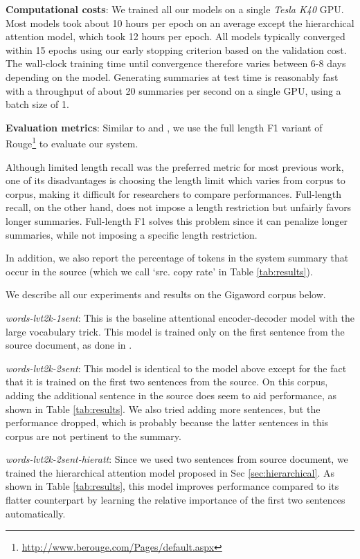 {\bf Computational costs}: We trained all our models on a single {\it Tesla K40} GPU. Most models took about 10 hours per epoch on an average except the hierarchical attention model, which took 12 hours per epoch. All models typically converged within 15 epochs using our early stopping criterion based on the validation cost. The wall-clock training time until convergence therefore varies between 6-8 days depending on the model. Generating summaries at test time is reasonably fast with a throughput of about 20 summaries per second on a single GPU, using a batch size of 1. 

{\bf Evaluation metrics}: Similar to \cite{nallapati} and \cite{chopra}, we use the full length F1 variant of Rouge\footnote{\url{http://www.berouge.com/Pages/default.aspx}} to evaluate our system.

Although limited length recall was the preferred metric for most previous work, one of its disadvantages is choosing the length limit which varies from corpus to corpus, making it difficult for researchers to compare performances. Full-length recall, on the other hand, does not impose a length restriction but unfairly favors longer summaries. Full-length F1 solves this problem since it can penalize longer summaries, while not imposing a specific length restriction. 

In addition, we also report the percentage of tokens in the system summary that occur in the source (which we call `src. copy rate' in Table \ref{tab:results}). 

 We describe all our experiments and results on the Gigaword corpus below.

{\it words-lvt2k-1sent}: This is the baseline attentional encoder-decoder model with the large vocabulary trick. This model is trained only on the first sentence from the source document, as done in .

{\it words-lvt2k-2sent}: This model is identical to the model above except for the fact that it is trained on the first two sentences from the source. On this corpus, adding the additional sentence in the source does seem to aid performance, as shown in Table \ref{tab:results}. We also tried adding more sentences, but the performance dropped, which is probably because the latter sentences in this corpus are not pertinent to the summary.

{\it words-lvt2k-2sent-hieratt}:  Since we used two sentences from source document, we trained the hierarchical attention model proposed in Sec \ref{sec:hierarchical}. As shown in Table \ref{tab:results}, this model improves performance compared to its flatter counterpart by learning the relative importance of the first two sentences automatically. 


